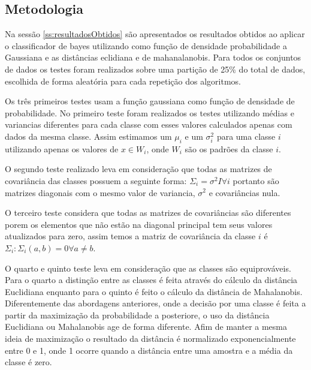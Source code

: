 \documentclass[ 
	article,			%
	11pt,				%
	oneside,			%
	a4paper,			%
	english,			%
	brazil,				%
	]{abntex2}
\begin{document}
\subsection{Metodologia}
\label{ss:metAplbayes}
Na sessão \ref{ss:resultadosObtidos} são apresentados os resultados obtidos ao
aplicar o classificador de bayes utilizando como função de densidade
probabilidade a Gaussiana e as distâncias eclidiana e de mahanalanobis. Para
todos os conjuntos de dados os testes foram realizados sobre uma partição de 25\% do total de dados, escolhida de forma
aleatória para cada repetição dos algoritmos.

Os três primeiros testes usam a função gaussiana como função de
densidade de probabilidade. No primeiro teste foram realizados os testes
utilizando médias e variancias diferentes para cada classe com esses valores
calculados apenas com dados da mesma classe. Assim estimamos um $\mu_i$ e um
$\sigma^2_i$ para uma classe $i$ utilizando apenas os valores de $x \in W_i$, onde $W_i$ são os padrões da classe $i$.

O segundo teste realizado leva em consideração que todas as matrizes de
covariância das classes possuem a seguinte forma: $\Sigma_i=\sigma^2I \forall i$
portanto são matrizes diagonais com o mesmo valor de variancia, $\sigma^2$ e
covariâncias nula.

O terceiro teste considera que todas as matrizes de covariâncias são diferentes
porem os elementos que não estão na diagonal principal tem seus valores
atualizados para zero, assim temos a matriz de covariância da classe
$i$ é $\Sigma_i : \Sigma_i(a,b)=0 \forall a \neq b$.

O quarto e quinto teste leva em consideração que as classes são equiprováveis.
Para o quarto a distinção entre as classes é feita através do cálculo da
distância Euclidiana enquanto para o quinto é feito o cálculo da distância de
Mahalanobis. Diferentemente das abordagens anteriores, onde a decisão por uma
classe é feita a partir da maximização da probabilidade a posteriore, o uso da
distância Euclidiana ou Mahalanobis age de forma diferente. Afim de manter a
mesma ideia de maximização o resultado da distância é normalizado
exponencialmente entre 0 e 1, onde 1 ocorre quando a distância entre uma amostra
e a média da classe é zero.


 
\end{document}
